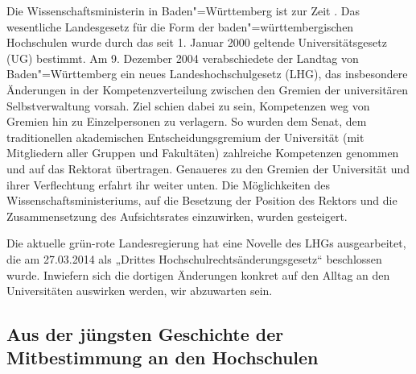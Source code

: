 Die Wissenschaftsministerin in Baden"=Württemberg ist zur Zeit \wissenschaftsministerbawue.
Das wesentliche Landesgesetz für die Form der
baden"=württembergischen Hochschulen wurde durch das seit 1. Januar 2000
geltende Universitätsgesetz (UG) bestimmt. Am 9. Dezember 2004
verabschiedete der Landtag von Baden"=Württemberg ein neues
Landeshochschulgesetz (LHG), das insbesondere Änderungen in der
Kompetenzverteilung zwischen den Gremien der universitären
Selbstverwaltung vorsah. Ziel schien dabei zu sein, Kompetenzen weg von
Gremien hin zu Einzelpersonen zu verlagern. So wurden dem Senat, dem
traditionellen akademischen Entscheidungsgremium der Universität (mit
Mitgliedern aller Gruppen und Fakultäten) zahlreiche Kompetenzen genommen
und auf das Rektorat übertragen. Genaueres zu den Gremien der Universität
und ihrer Verflechtung erfahrt ihr weiter unten. Die Möglichkeiten des
Wissenschaftsministeriums, auf die Besetzung der Position des Rektors und
die Zusammensetzung des Aufsichtsrates einzuwirken, wurden gesteigert.

Die aktuelle grün-rote Landesregierung hat eine Novelle des LHGs ausgearbeitet, 
die am 27.03.2014 als „Drittes Hochschulrechtsänderungsgesetz“ beschlossen wurde.
Inwiefern sich die dortigen Änderungen konkret auf den Alltag an den Universitäten 
auswirken werden, wir abzuwarten sein.


\subsection{Aus der jüngsten Geschichte der Mitbestimmung an den Hochschulen}


